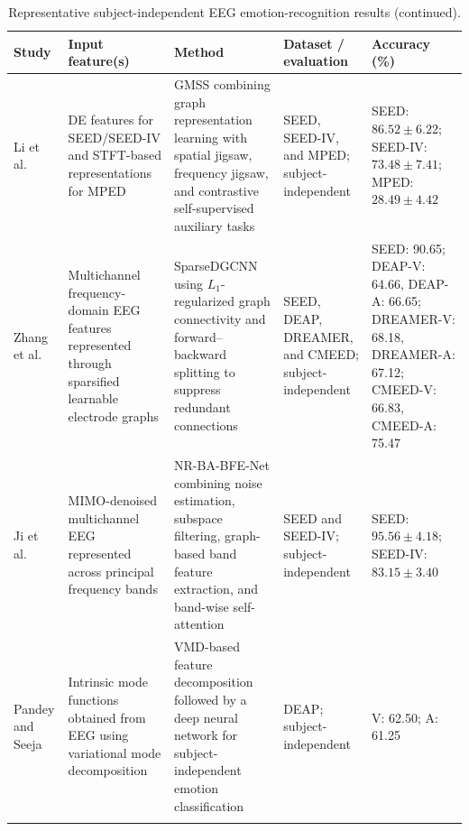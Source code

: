 \documentclass{WileyMSP-template}
\newcommand{\lightrowsep}{%
    \arrayrulecolor{lightrowgray}%
    \specialrule{0.30pt}{3.5pt}{3.5pt}%
    \arrayrulecolor{black}%
}
\begin{document}
\begin{table}

\addtocounter{table}{-1}

\centering

\caption{Representative subject-independent EEG emotion-recognition results
(continued).}

\scriptsize
\setlength{\tabcolsep}{2.5pt}
\renewcommand{\arraystretch}{1.12}

\begin{tabularx}{\textheight}{
>{\raggedright\arraybackslash}p{3.15cm}
>{\raggedright\arraybackslash}X
>{\raggedright\arraybackslash}X
>{\raggedright\arraybackslash}p{3.45cm}
>{\raggedright\arraybackslash}p{5.0cm}}

\toprule

\textbf{Study} &
\textbf{Input feature(s)} &
\textbf{Method} &
\textbf{Dataset / evaluation} &
\textbf{Accuracy (\%)} \\

\midrule

Li et al. \cite{li2023gmss} &
DE features for SEED/SEED-IV and STFT-based representations for MPED &
GMSS combining graph representation learning with spatial jigsaw,
frequency jigsaw, and contrastive self-supervised auxiliary tasks &
SEED, SEED-IV, and MPED; subject-independent &
SEED: $86.52 \pm 6.22$;
SEED-IV: $73.48 \pm 7.41$;
MPED: $28.49 \pm 4.42$ \\
\lightrowsep

Zhang et al. \cite{zhang2023sparsedgcnn} &
Multichannel frequency-domain EEG features represented through
sparsified learnable electrode graphs &
SparseDGCNN using $L_1$-regularized graph connectivity and
forward--backward splitting to suppress redundant connections &
SEED, DEAP, DREAMER, and CMEED; subject-independent &
SEED: 90.65;
DEAP-V: 64.66, DEAP-A: 66.65;
DREAMER-V: 68.18, DREAMER-A: 67.12;
CMEED-V: 66.83, CMEED-A: 75.47 \\
\lightrowsep

Ji et al. \cite{ji2026nrba} &
MIMO-denoised multichannel EEG represented across principal frequency bands &
NR-BA-BFE-Net combining noise estimation, subspace filtering,
graph-based band feature extraction, and band-wise self-attention &
SEED and SEED-IV; subject-independent &
SEED: $95.56 \pm 4.18$;
SEED-IV: $83.15 \pm 3.40$ \\
\lightrowsep

Pandey and Seeja \cite{pandey2022vmd} &
Intrinsic mode functions obtained from EEG using variational mode decomposition &
VMD-based feature decomposition followed by a deep neural network
for subject-independent emotion classification &
DEAP; subject-independent &
V: 62.50;
A: 61.25 \\
\lightrowsep


\end{tabularx}
\end{table}
\end{document}
